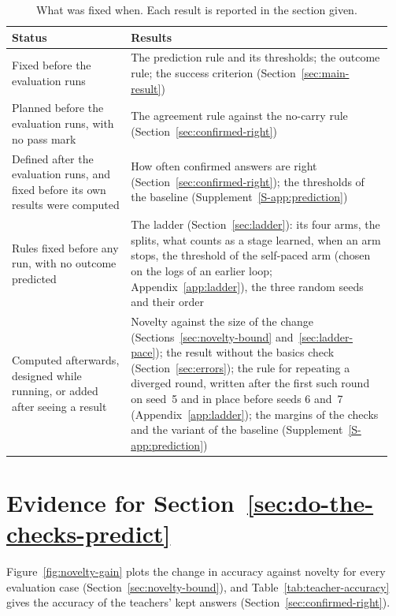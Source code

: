 \begin{table}[htbp]
\centering
\caption{What was fixed when. Each result is reported in the section given.}
\label{tab:fixed-when}
\small
\begin{tabular}{@{}>{\raggedright\arraybackslash}p{0.3\linewidth}>{\raggedright\arraybackslash}p{0.66\linewidth}@{}}
\toprule
Status & Results \\
\midrule
Fixed before the evaluation runs & The prediction rule and its thresholds; the
  outcome rule; the success criterion (Section~\ref{sec:main-result}) \\
\addlinespace
Planned before the evaluation runs, with no pass mark & The agreement rule
  against the no-carry rule (Section~\ref{sec:confirmed-right}) \\
\addlinespace
Defined after the evaluation runs, and fixed before its own results were
  computed & How often confirmed answers are right
  (Section~\ref{sec:confirmed-right}); the thresholds of the baseline
  (Supplement~\ref{S-app:prediction}) \\
\addlinespace
Rules fixed before any run, with no outcome predicted & The ladder
  (Section~\ref{sec:ladder}): its four arms, the splits, what counts as a
  stage learned, when an arm stops, the threshold of the self-paced arm
  (chosen on the logs of an earlier loop; Appendix~\ref{app:ladder}), the
  three random seeds and their order \\
\addlinespace
Computed afterwards, designed while running, or added after seeing a result
  & Novelty against the size of the change
  (Sections~\ref{sec:novelty-bound} and~\ref{sec:ladder-pace}); the result
  without the basics check (Section~\ref{sec:errors}); the rule for
  repeating a diverged round, written after the first such round on seed~5
  and in place before seeds 6 and~7 (Appendix~\ref{app:ladder});
  the margins of the checks and the variant of the baseline
  (Supplement~\ref{S-app:prediction}) \\
\bottomrule
\end{tabular}
\end{table}


\section{Evidence for Section~\ref{sec:do-the-checks-predict}}
\label{app:evidence}

Figure~\ref{fig:novelty-gain} plots the change in accuracy against novelty
for every evaluation case (Section~\ref{sec:novelty-bound}), and
Table~\ref{tab:teacher-accuracy} gives the accuracy of the teachers' kept
answers (Section~\ref{sec:confirmed-right}).


